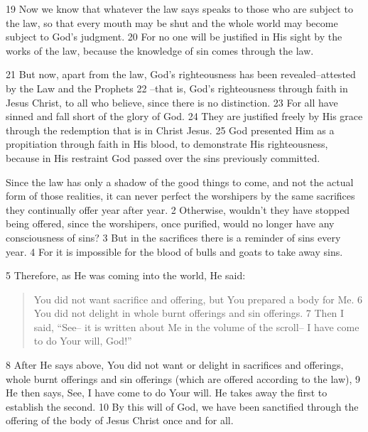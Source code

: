 \begin{bible}

19 Now we know that whatever the law says speaks to those who are subject to the law, so that every mouth may be shut and the whole world may become subject to God's judgment. 20 For no one will be justified in His sight by the works of the law, because the knowledge of sin comes through the law.

21 But now, apart from the law, God's righteousness has been revealed--attested by the Law and the Prophets 22 --that is, God's righteousness through faith in Jesus Christ, to all who believe, since there is no distinction. 23 For all have sinned and fall short of the glory of God. 24 They are justified freely by His grace through the redemption that is in Christ Jesus. 25 God presented Him as a propitiation through faith in His blood, to demonstrate His righteousness, because in His restraint God passed over the sins previously committed.


Since the law has only a shadow of the good things to come, and not the actual form of those realities, it can never perfect the worshipers by the same sacrifices they continually offer year after year. 2 Otherwise, wouldn't they have stopped being offered, since the worshipers, once purified, would no longer have any consciousness of sins? 3 But in the sacrifices there is a reminder of sins every year. 4 For it is impossible for the blood of bulls and goats to take away sins.

5 Therefore, as He was coming into the world, He said:
\begin{quote}
You did not want sacrifice and offering,
but You prepared a body for Me.
6 You did not delight
in whole burnt offerings and sin offerings.
7 Then I said, ``See--
it is written about Me
in the volume of the scroll--
I have come to do Your will, God!''
\end{quote}
8 After He says above, You did not want or delight in sacrifices and offerings, whole burnt offerings and sin offerings (which are offered according to the law), 9 He then says, See, I have come to do Your will. He takes away the first to establish the second. 10 By this will of God, we have been sanctified through the offering of the body of Jesus Christ once and for all.


\end{bible}
